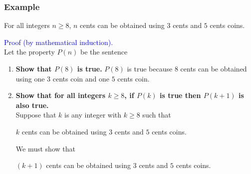 \documentclass{beamer}
\begin{document}
\begin{frame}%
\frametitle{Example}


\scriptsize

\begin{block}{}
For all integers $n \ge 8$, $n$ cents can be obtained using $3$ cents and $5$ cents coins.
\end{block}
\textcolor{blue}{Proof (by mathematical induction).}\\
\vspace{0.15cm}
Let the property $P(n)$ be the sentence\\
\begin{center}
\end{center}
\begin{enumerate}
\item<3-> \textbf{Show that $P(8)$ is true.} $P(8)$ is true because $8$ cents can be obtained using one $3$ cents coin and one $5$ cents coin.\\

\vspace{0.2cm}

\item<4-> \textbf{Show that for all integers $k \ge 8$, if $P(k)$ is true then $P(k+1)$ is also true.}\\
Suppose that $k$ is any integer with $k \ge 8$ such that\\
\begin{center}
$k$ cents can be obtained using $3$ cents and $5$ cents coins.
\end{center}
We must show that\\
\begin{center}
$(k + 1)$ cents can be obtained using $3$ cents and $5$ cents coins.
\end{center}

\end{enumerate}

\end{frame}
\end{document}
